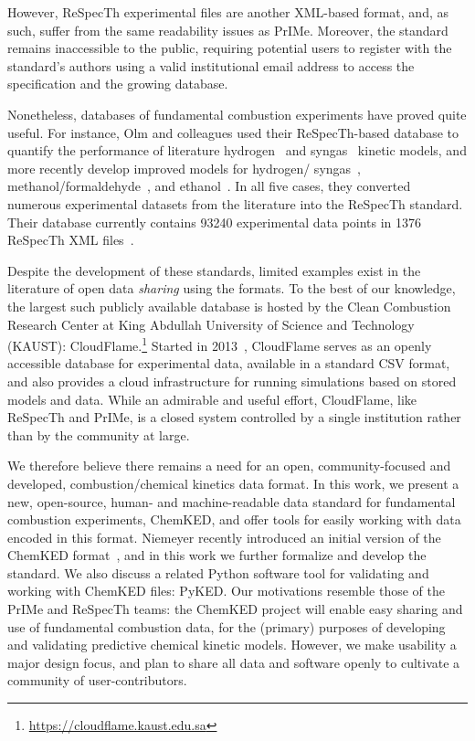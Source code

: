 \documentclass[12pt]{ijck}
\newcommand\ck{ChemKED}
\newcommand\pk{PyKED}
\begin{document}
However, ReSpecTh experimental files are another
XML-based format, and, as such, suffer from the same readability issues as PrIMe.
Moreover, the standard remains inaccessible to the public, requiring potential users
to register with the standard's authors using a valid institutional email address
to access the specification and the growing database.

Nonetheless, databases of fundamental combustion experiments
have proved quite useful. For instance, Olm and colleagues used their
ReSpecTh-based database to quantify the performance of literature
hydrogen~\autocite{Olm:2014gn} and syngas~\autocite{Olm:2015ch} kinetic models,
and more recently develop improved models for hydrogen\slash
syngas~\autocite{Varga:2016gj}, methanol\slash formaldehyde~\autocite{Olm:2017a},
and ethanol~\autocite{Olm:2016et}. In all five cases, they converted numerous
experimental datasets from the literature into the ReSpecTh standard.
Their database currently contains \num{93240} experimental data points in 1376
ReSpecTh XML files~\autocite{respecth}.

Despite the development of these standards, limited examples exist in the
literature of open data \emph{sharing} using the formats. To the best
of our knowledge, the largest such publicly available database is hosted by
the Clean Combustion Research Center at King Abdullah University of Science and
Technology (KAUST): CloudFlame.\footnote{\url{https://cloudflame.kaust.edu.sa}}
Started in 2013~\autocite{Goteng:2013cf,Goteng:2014,ReynoChiasson:2015}, CloudFlame
serves as an openly accessible database for experimental data, available in a standard
CSV format, and also provides a cloud infrastructure for running simulations
based on stored models and data. While an admirable and useful effort,
CloudFlame, like ReSpecTh and PrIMe, is a closed system controlled by a single
institution rather than by the community at large.

We therefore believe there remains a need for an open, community-focused and
developed, combustion\slash chemical kinetics data format. In this work, we
present a new, open-source, human- and machine-readable data standard for
fundamental combustion experiments, \ck{}, and offer tools for easily working
with data encoded in this format. Niemeyer recently introduced an initial
version of the \ck{} format~\autocite{Niemeyer:2016wf}, and in this work we
further formalize and develop the standard. We also discuss a related Python
software tool for validating and working with \ck{} files: \pk{}. Our
motivations resemble those of the PrIMe and ReSpecTh teams: the \ck{} project
will enable easy sharing and use of fundamental combustion data, for the
(primary) purposes of developing and validating predictive chemical kinetic
models. However, we make usability a major design focus, and plan to share all
data and software openly to cultivate a community of user-contributors.
\end{document}
